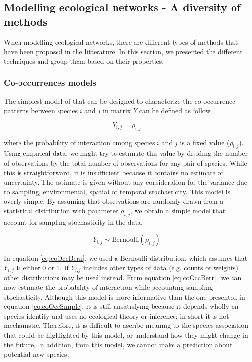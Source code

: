 \subsection*{Modelling ecological networks - A diversity of methods}
\label{models-of-species-interactions}

When modelling ecological networks, there are different types of methods that
have been proposed in the litterature. In this section, we presented the
different techniques and group them based on their properties.

\subsubsection*{Co-occurrences models}
\label{regression-based-models}

The simplest model of that can be designed to characterize the co-occurrence
patterns between species $i$ and $j$ in matrix $Y$ can be defined as follow

\begin{equation}
  \label{eq:coOccSimple}
  Y_{i,j} = \rho_{i,j}
\end{equation}

where the probability of interaction among species $i$ and $j$ is a fixed value
($\rho_{i,j}$). Using empirical data, we might try to estimate this value by
dividing the number of observations by the total number of observations for any
pair of species. While this is straightforward, it is insufficient because it
contains no estimate of uncertainty. The estimate is given without any
consideration for the variance due to sampling, environmental, spatial or
temporal stochasticity. This model is overly simple. By assuming that
observations are randomly drawn from a statistical distribution with parameter
$\rho_{i,j}$, we obtain a simple model that account for sampling stochasticity
in the data.

\begin{equation}
  \label{eq:coOccBern}
  Y_{i,j} \sim \text{Bernoulli}(\rho_{i,j})
\end{equation}

In equation \ref{eq:coOccBern}, we used a Bernoulli distribution, which assumes
that $Y_{i,j}$ is either 0 or 1. If $Y_{i,j}$ includes other types of data (e.g.
counts or weights) other distributions may be used instead. From equation
\ref{eq:coOccBern}, we can now estimate the probability of interaction while
accounting sampling stochasticity. Although this model is more informative than
the one presented in equation \ref{eq:coOccSimple}, it is still unsatisfying
because it depends wholly on species identity and uses no ecological theory or
inference; in short it is not mechanistic. Therefore, it is difficult to ascribe
meaning to the species association that could be highlighted by this model, or
understand how they might change in the future. In addition, from this model, we
cannot make a prediction about potential new species.

